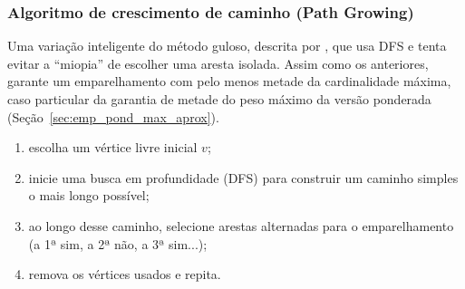 



\subsubsection{Algoritmo de crescimento de caminho (Path Growing)}
\label{p:h_path_growing_card}

Uma variação inteligente do método guloso, descrita por , que usa DFS e tenta evitar a ``miopia'' de escolher uma aresta isolada. Assim como os anteriores, garante um emparelhamento com pelo menos metade da cardinalidade máxima, caso particular da garantia de metade do peso máximo da versão ponderada (Seção~\ref{sec:emp_pond_max_aprox}).

\begin{enumerate}
    \item escolha um vértice livre inicial $v$;
    \item inicie uma busca em profundidade (DFS) para construir um caminho simples o mais longo possível;
    \item ao longo desse caminho, selecione arestas alternadas para o emparelhamento (a 1ª sim, a 2ª não, a 3ª sim...);
    \item remova os vértices usados e repita.
\end{enumerate}

